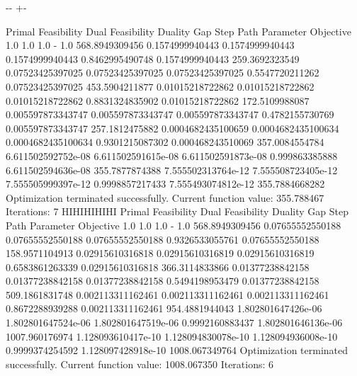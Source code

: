 \documentclass[letterpaper,10pt,english]{sphinxmanual}
\newlength\nbsphinxcodecellspacing
\begin{document}
{

\kern-\sphinxverbatimsmallskipamount\kern-\baselineskip
\kern+\FrameHeightAdjust\kern-\fboxrule
\vspace{\nbsphinxcodecellspacing}

\begin{sphinxVerbatim}[commandchars=\\\{\}]
Primal Feasibility  Dual Feasibility    Duality Gap         Step             Path Parameter      Objective
1.0                 1.0                 1.0                 -                1.0                 568.8949309456
0.1574999940443     0.1574999940443     0.1574999940443     0.8462995490748  0.1574999940443     259.3692323549
0.07523425397025    0.07523425397025    0.07523425397025    0.5547720211262  0.07523425397025    453.5904211877
0.01015218722862    0.01015218722862    0.01015218722862    0.8831324835902  0.01015218722862    172.5109988087
0.005597873343747   0.005597873343747   0.005597873343747   0.4782155730769  0.005597873343747   257.1812475882
0.0004682435100659  0.0004682435100634  0.0004682435100634  0.9301215087302  0.000468243510069   357.0084554784
6.611502592752e-08  6.611502591615e-08  6.611502591873e-08  0.999863385888   6.611502594636e-08  355.7877874388
7.555502313764e-12  7.555508723405e-12  7.555505999397e-12  0.9998857217433  7.555493074812e-12  355.7884668282
Optimization terminated successfully.
         Current function value: 355.788467
         Iterations: 7
HIHIHIHIHI
Primal Feasibility  Dual Feasibility    Duality Gap         Step             Path Parameter      Objective
1.0                 1.0                 1.0                 -                1.0                 568.8949309456
0.07655552550188    0.07655552550188    0.07655552550188    0.9326533055761  0.07655552550188    158.9571104913
0.02915610316818    0.02915610316819    0.02915610316819    0.6583861263339  0.02915610316818    366.3114833866
0.01377238842158    0.01377238842158    0.01377238842158    0.5494198953479  0.01377238842158    509.1861831748
0.002113311162461   0.002113311162461   0.002113311162461   0.8672288939288  0.002113311162461   954.4881944043
1.802801647426e-06  1.802801647524e-06  1.802801647519e-06  0.9992160883437  1.802801646136e-06  1007.960176974
1.128093610417e-10  1.128094830078e-10  1.128094936008e-10  0.9999374254592  1.128097428918e-10  1008.067349764
Optimization terminated successfully.
         Current function value: 1008.067350
         Iterations: 6

\end{sphinxVerbatim}}
\end{document}
